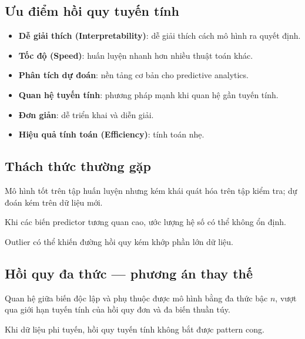 \subsection{Ưu điểm hồi quy tuyến tính}

\begin{tinhchat}[title={Advantages}]
\begin{itemize}
  \item \textbf{Dễ giải thích (Interpretability)}: dễ giải thích cách mô hình ra quyết định.
  \item \textbf{Tốc độ (Speed)}: huấn luyện nhanh hơn nhiều thuật toán khác.
  \item \textbf{Phân tích dự đoán}: nền tảng cơ bản cho predictive analytics.
  \item \textbf{Quan hệ tuyến tính}: phương pháp mạnh khi quan hệ gần tuyến tính.
  \item \textbf{Đơn giản}: dễ triển khai và diễn giải.
  \item \textbf{Hiệu quả tính toán (Efficiency)}: tính toán nhẹ.
\end{itemize}
\end{tinhchat}

\subsection{Thách thức thường gặp}

\begin{luuy}[title={Overfitting}]
Mô hình tốt trên tập huấn luyện nhưng kém khái quát hóa trên tập kiểm tra; dự đoán kém trên dữ liệu mới.
\end{luuy}

\begin{luuy}[title={Đa cộng tuyến (Multicollinearity)}]
Khi các biến predictor tương quan cao, ước lượng hệ số có thể không ổn định.
\end{luuy}

\begin{luuy}[title={Outlier}]
Outlier có thể khiến đường hồi quy kém khớp phần lớn dữ liệu.
\end{luuy}

\subsection{Hồi quy đa thức --- phương án thay thế}

\begin{dinhnghia}[title={Polynomial Regression}]
Quan hệ giữa biến độc lập và phụ thuộc được mô hình bằng đa thức bậc $n$, vượt qua giới hạn tuyến tính của hồi quy đơn và đa biến thuần túy.
\end{dinhnghia}

\begin{ynghia}[title={Khi nào cần}]
Khi dữ liệu phi tuyến, hồi quy tuyến tính không bắt được pattern cong.
\end{ynghia}
